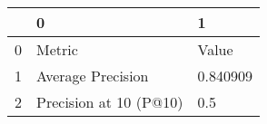 \begin{tabular}{lll}
\toprule
{} &                       0 &         1 \\
\midrule
0 &                  Metric &     Value \\
1 &       Average Precision &  0.840909 \\
2 &  Precision at 10 (P@10) &       0.5 \\
\bottomrule
\end{tabular}
